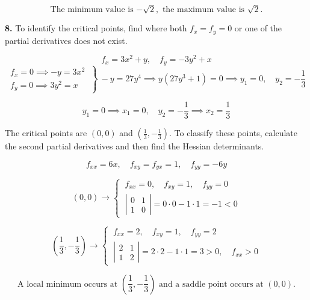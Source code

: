 \documentclass{article}
\begin{document}
\[\boxed{\text{The minimum value is }{-\sqrt2},\text{ the maximum value is }\sqrt2.}\]

\vspace{1em}

\textbf{8.} To identify the critical points, find where both $f_x=f_y=0$ or one of the partial derivatives does not exist.

\[f_x=3x^2+y,\quad f_y=-3y^2+x\]
\[\left.\begin{array}{c}
f_x=0\implies-y=3x^2\\
f_y=0\implies3y^2=x 
\end{array}\:\right\}\:-y=27y^4\implies y(27y^3+1)=0\implies y_1=0,\quad y_2=-\frac13\]

\[y_1=0\implies x_1=0,\quad y_2=-\frac13\implies x_2=\frac13\]

The critical points are $(0,0)$ and $\left(\frac13,-\frac13\right)$. To classify these points, calculate the second partial derivatives and then find the Hessian determinants.

\[f_{xx}=6x,\quad f_{xy}=f_{yx}=1,\quad f_{yy}=-6y\]

\[(0,0)\rightarrow\left\{\:\begin{array}{l}
f_{xx}=0,\quad f_{xy}=1,\quad f_{yy}=0\\[1em]
\left|\begin{array}{cc}
0 & 1\\
1 & 0
\end{array}\right|=0\cdot0-1\cdot1=-1<0
\end{array}\right.\]

\[\left(\frac13,-\frac13\right)\rightarrow\left\{\:\begin{array}{l}
f_{xx}=2,\quad f_{xy}=1,\quad f_{yy}=2\\[1em]
\left|\begin{array}{cc}
2 & 1\\
1 & 2
\end{array}\right|=2\cdot2-1\cdot1=3>0,\quad f_{xx}>0
\end{array}\right.\]

\[\boxed{\text{A local minimum occurs at }\left(\frac13,-\frac13\right)\text{ and a saddle point occurs at }(0,0).}\]
\end{document}
